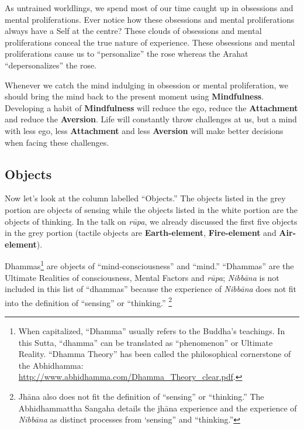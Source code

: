 As untrained worldlings, we spend most of our time caught up in obsessions and mental proliferations. Ever notice how these obsessions and mental proliferations always have a Self at the centre? These clouds of obsessions and mental proliferations conceal the true nature of experience. These obsessions and mental proliferations cause us to “personalize” the rose whereas the Arahat “depersonalizes” the rose.

Whenever we catch the mind indulging in obsession or mental proliferation, we should bring the mind back to the present moment using \textbf{Mindfulness}. Developing a habit of \textbf{Mindfulness} will reduce the ego, reduce the \textbf{Attachment} and reduce the \textbf{Aversion}. Life will constantly throw challenges at us, but a mind with less ego, less \textbf{Attachment} and less \textbf{Aversion} will make better decisions when facing these challenges.

\subsection*{Objects}

Now let’s look at the column labelled “Objects.” The objects listed in the grey portion are objects of sensing while the objects listed in the white portion are the objects of thinking. In the talk on \textit{rūpa}, we already discussed the first five objects in the grey portion (tactile objects are \textbf{Earth-element}, \textbf{Fire-element} and \textbf{Air-element}).

Dhammas\footnote{When capitalized, “Dhamma” usually refers to the Buddha’s teachings. In this Sutta, “dhamma” can be translated as “phenomenon” or Ultimate Reality. “Dhamma Theory” has been called the philosophical cornerstone of the Abhidhamma: \url{http://www.abhidhamma.com/Dhamma_Theory_clear.pdf}.} are objects of “mind-consciousness” and “mind.” “Dhammas” are the Ultimate Realities of consciousness, Mental Factors and \textit{rūpa}; \textit{Nibbāna} is not included in this list of “dhammas” because the experience of \textit{Nibbāna} does not fit into the definition of “sensing” or “thinking.” \footnote{Jhāna also does not fit the definition of “sensing” or “thinking.” The Abhidhammattha Sangaha details the jhāna experience and the experience of \textit{Nibbāna} as distinct processes from `sensing” and “thinking.”}

